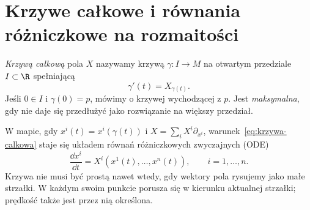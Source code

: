 \section{Krzywe całkowe i równania różniczkowe na rozmaitości}
\label{sec:krzywe}

\begin{definicja}
\emph{Krzywą całkową} pola $X$ nazywamy krzywą
$\gamma\colon I\to M$ na otwartym przedziale $I\subset\R$ spełniającą
\begin{equation}\label{eq:krzywa-calkowa}
 \gamma'(t)=X_{\gamma(t)}.
\end{equation}
Jeśli $0\in I$ i $\gamma(0)=p$, mówimy o krzywej wychodzącej z $p$.
Jest \emph{maksymalna}, gdy nie daje się przedłużyć jako rozwiązanie
na większy przedział.
\end{definicja}

W mapie, gdy $x^i(t)=x^i(\gamma(t))$ i
$X=\sum_i X^i\partial_{x^i}$,
warunek~\eqref{eq:krzywa-calkowa} staje się układem równań
różniczkowych zwyczajnych (ODE)
\[
 \frac{\dd x^i}{\dd t}=X^i(x^1(t),\ldots,x^n(t)),\qquad i=1,\ldots,n.
\]
Krzywa nie musi być prostą nawet wtedy, gdy wektory pola rysujemy
jako małe strzałki. W każdym swoim punkcie porusza się w kierunku
aktualnej strzałki; prędkość także jest przez nią określona.

